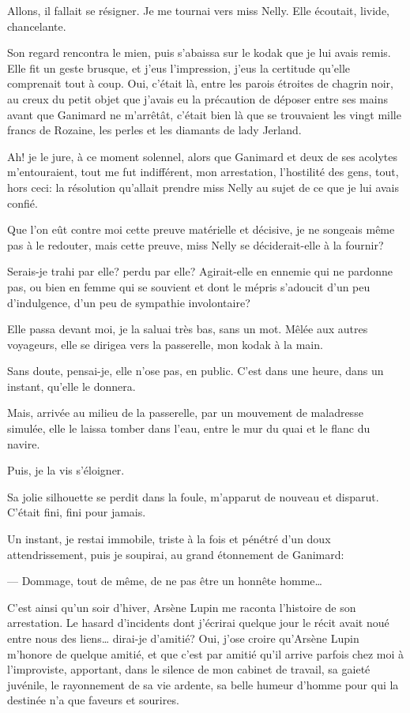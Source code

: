 \documentclass[12pt,a4paper]{article}
\begin{document}
Allons, il fallait se résigner. Je me tournai vers miss Nelly. Elle écoutait, livide, chancelante.

Son regard rencontra le mien, puis s’abaissa sur le kodak que je lui avais remis. Elle fit un geste brusque, et j’eus l’impression, j’eus la certitude qu’elle comprenait tout à coup. Oui, c’était là, entre les parois étroites de chagrin noir, au creux du petit objet que j’avais eu la précaution de déposer entre ses mains avant que Ganimard ne m’arrêtât, c’était bien là que se trouvaient les vingt mille francs de Rozaine, les perles et les diamants de lady Jerland.

Ah! je le jure, à ce moment solennel, alors que Ganimard et deux de ses acolytes m’entouraient, tout me fut indifférent, mon arrestation, l’hostilité des gens, tout, hors ceci: la résolution qu’allait prendre miss Nelly au sujet de ce que je lui avais confié.

Que l’on eût contre moi cette preuve matérielle et décisive, je ne songeais même pas à le redouter, mais cette preuve, miss Nelly se déciderait-elle à la fournir?

Serais-je trahi par elle? perdu par elle? Agirait-elle en ennemie qui ne pardonne pas, ou bien en femme qui se souvient et dont le mépris s’adoucit d’un peu d’indulgence, d’un peu de sympathie involontaire?

Elle passa devant moi, je la saluai très bas, sans un mot. Mêlée aux autres voyageurs, elle se dirigea vers la passerelle, mon kodak à la main.

Sans doute, pensai-je, elle n’ose pas, en public. C’est dans une heure, dans un instant, qu’elle le donnera.

Mais, arrivée au milieu de la passerelle, par un mouvement de maladresse simulée, elle le laissa tomber dans l’eau, entre le mur du quai et le flanc du navire.

Puis, je la vis s’éloigner.

Sa jolie silhouette se perdit dans la foule, m’apparut de nouveau et disparut. C’était fini, fini pour jamais.

Un instant, je restai immobile, triste à la fois et pénétré d’un doux attendrissement, puis je soupirai, au grand étonnement de Ganimard:

— Dommage, tout de même, de ne pas être un honnête homme… 

C’est ainsi qu’un soir d’hiver, Arsène Lupin me raconta l’histoire de son arrestation. Le hasard d’incidents dont j’écrirai quelque jour le récit avait noué entre nous des liens… dirai-je d’amitié? Oui, j’ose croire qu’Arsène Lupin m’honore de quelque amitié, et que c’est par amitié qu’il arrive parfois chez moi à l’improviste, apportant, dans le silence de mon cabinet de travail, sa gaieté juvénile, le rayonnement de sa vie ardente, sa belle humeur d’homme pour qui la destinée n’a que faveurs et sourires.
\end{document}
